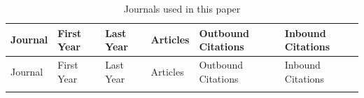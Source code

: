 \documentclass[
  12pt,
  letterpaper,
  DIV=11,
  numbers=noendperiod]{scrartcl}
\begin{document}
\begin{longtable}[]{@{}
  >{\raggedright\arraybackslash}p{}
  >{\raggedleft\arraybackslash}p{}
  >{\raggedleft\arraybackslash}p{}
  >{\raggedleft\arraybackslash}p{}
  >{\raggedleft\arraybackslash}p{}
  >{\raggedleft\arraybackslash}p{}@{}}
\caption{Journals used in this paper}\tabularnewline
\toprule\noalign{}
\begin{minipage}[b]{\linewidth}\raggedright
Journal
\end{minipage} & \begin{minipage}[b]{\linewidth}\raggedleft
First Year
\end{minipage} & \begin{minipage}[b]{\linewidth}\raggedleft
Last Year
\end{minipage} & \begin{minipage}[b]{\linewidth}\raggedleft
Articles
\end{minipage} & \begin{minipage}[b]{\linewidth}\raggedleft
Outbound Citations
\end{minipage} & \begin{minipage}[b]{\linewidth}\raggedleft
Inbound Citations
\end{minipage} \\
\midrule\noalign{}
\endfirsthead
\toprule\noalign{}
\begin{minipage}[b]{\linewidth}\raggedright
Journal
\end{minipage} & \begin{minipage}[b]{\linewidth}\raggedleft
First Year
\end{minipage} & \begin{minipage}[b]{\linewidth}\raggedleft
Last Year
\end{minipage} & \begin{minipage}[b]{\linewidth}\raggedleft
Articles
\end{minipage} & \begin{minipage}[b]{\linewidth}\raggedleft
Outbound Citations
\end{minipage} & \begin{minipage}[b]{\linewidth}\raggedleft
Inbound Citations
\end{minipage} \\
\midrule\noalign{}
\endhead

\end{longtable}
\end{document}
